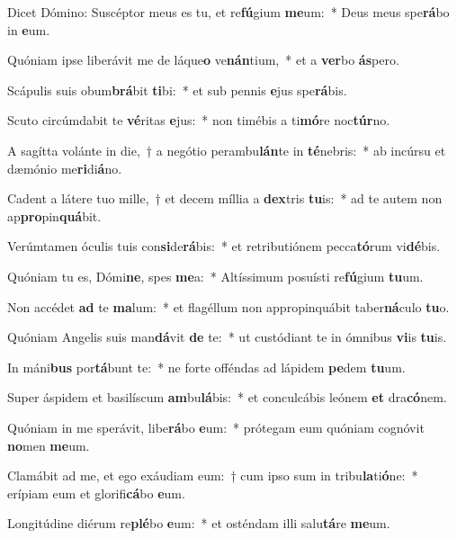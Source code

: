 \item Dicet Dómino: Suscéptor meus es tu, et re\textbf{fú}gium \textbf{me}um:~* Deus meus spe\textbf{rá}bo in \textbf{e}um.
\item Quóniam ipse liberávit me de láque\textbf{o} ve\textbf{nán}tium,~* et a \textbf{ver}bo \textbf{ás}pero.
\item Scápulis suis obum\textbf{brá}bit \textbf{ti}bi:~* et sub pennis \textbf{e}jus spe\textbf{rá}bis.
\item Scuto circúmdabit te \textbf{vé}ritas \textbf{e}jus:~* non timébis a ti\textbf{mó}re noc\textbf{túr}no.
\item A sagítta volánte in die,~† a negótio perambu\textbf{lán}te in \textbf{té}nebris:~* ab incúrsu et dæmónio me\textbf{ri}di\textbf{á}no.
\item Cadent a látere tuo mille,~† et decem míllia a \textbf{dex}tris \textbf{tu}is:~* ad te autem non ap\textbf{pro}pin\textbf{quá}bit.
\item Verúmtamen óculis tuis con\textbf{si}de\textbf{rá}bis:~* et retributiónem pecca\textbf{tó}rum vi\textbf{dé}bis.
\item Quóniam tu es, Dómi\textbf{ne}, spes \textbf{me}a:~* Altíssimum posuísti re\textbf{fú}gium \textbf{tu}um.
\item Non accédet \textbf{ad} te \textbf{ma}lum:~* et flagéllum non appropinquábit taber\textbf{ná}culo \textbf{tu}o.
\item Quóniam Angelis suis man\textbf{dá}vit \textbf{de} te:~* ut custódiant te in ómnibus \textbf{vi}is \textbf{tu}is.
\item In máni\textbf{bus} por\textbf{tá}bunt te:~* ne forte offéndas ad lápidem \textbf{pe}dem \textbf{tu}um.
\item Super áspidem et basilíscum \textbf{am}bu\textbf{lá}bis:~* et conculcábis leónem \textbf{et} dra\textbf{có}nem.
\item Quóniam in me sperávit, libe\textbf{rá}bo \textbf{e}um:~* prótegam eum quóniam cognóvit \textbf{no}men \textbf{me}um.
\item Clamábit ad me, et ego exáudiam eum:~† cum ipso sum in tribu\textbf{la}ti\textbf{ó}ne:~* erípiam eum et glorifi\textbf{cá}bo \textbf{e}um.
\item Longitúdine diérum re\textbf{plé}bo \textbf{e}um:~* et osténdam illi salu\textbf{tá}re \textbf{me}um.
